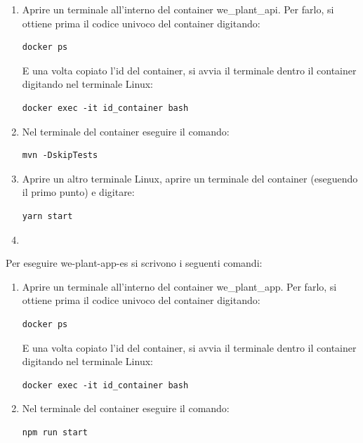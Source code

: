 \documentclass[a4paper]{article}
\begin{document}
	\begin{enumerate}
		\item Aprire un terminale all'interno del container \textsf{we\_plant\_api}. Per farlo, si ottiene prima il codice univoco del container digitando:
		\begin{lstlisting}
docker ps\end{lstlisting}
		E una volta copiato l'id del container, si avvia il terminale dentro il container digitando nel terminale Linux:
		\begin{lstlisting}
docker exec -it id_container bash\end{lstlisting}
		
		\item Nel terminale del container eseguire il comando:
		\begin{lstlisting}
mvn -DskipTests\end{lstlisting}
		
		\item Aprire un altro terminale Linux, aprire un terminale del container (eseguendo il primo punto) e digitare:
		\begin{lstlisting}
yarn start\end{lstlisting}
		
		\item 
	\end{enumerate}
	Per eseguire \textsf{we-plant-app-es} si scrivono i seguenti comandi:
	\begin{enumerate}
		\item Aprire un terminale all'interno del container \textsf{we\_plant\_app}. Per farlo, si ottiene prima il codice univoco del container digitando:
		\begin{lstlisting}
docker ps\end{lstlisting}
		E una volta copiato l'id del container, si avvia il terminale dentro il container digitando nel terminale Linux:
		\begin{lstlisting}
docker exec -it id_container bash\end{lstlisting}
		
		\item Nel terminale del container eseguire il comando:
		\begin{lstlisting}
npm run start\end{lstlisting}
	\end{enumerate}
\end{document}
